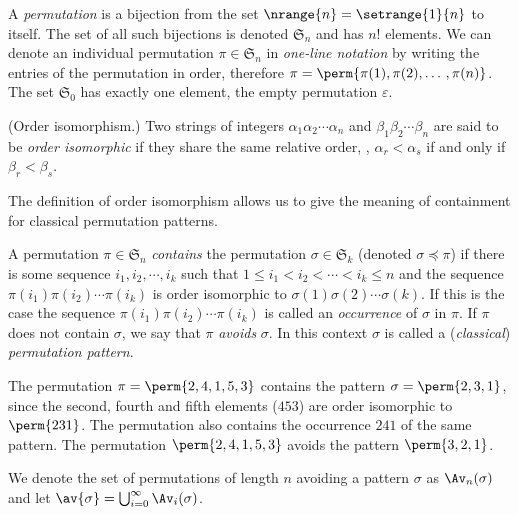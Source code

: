A \emph{permutation} is a bijection from the set \(\nrange{n} = \setrange{1}{n}\) to itself. The
set of all such bijections is denoted \(\mathfrak{S}_n\) and has \(n!\) elements. We can
denote an individual permutation \(\pi\in\mathfrak{S}_n\) in \emph{one-line notation} by writing the
entries of the permutation in order, therefore \(\pi = \perm{\pi(1),\pi(2),\dotso,\pi(n)}\). The
set \(\mathfrak{S}_0\) has exactly one element, the empty permutation \(\varepsilon\).

\begin{definition}{(Order isomorphism.)}
    Two strings of integers \(\alpha_1\alpha_2\dotsm\alpha_n\) and
    \(\beta_1\beta_2\dotsm\beta_n\) are said to be \emph{order isomorphic}
    if they share the same relative order, \ie, \(\alpha_r<\alpha_s\) if and
    only if \(\beta_r<\beta_s\).
\end{definition}

The definition of order isomorphism allows us to give the meaning of containment for classical
permutation patterns.
\begin{definition}
    A permutation \(\pi\in\mathfrak{S}_n\) \emph{contains} the permutation \(\sigma\in\mathfrak{S}_k\) (\mbox{denoted}
    \(\sigma \preceq \pi\)) if there is some sequence \( i_1,i_2,\dotsm{},i_k\)
    such that \(1\le i_1<i_2<\dotsm<i_k\le n\) and the sequence \(\pi(i_1)\pi(i_2)\dotsm\pi(i_k)\) is order isomorphic to
    \(\sigma(1)\sigma(2)\dotsm\sigma(k)\). If this is the case the sequence
    \(\pi(i_1)\pi(i_2)\dotsm\pi(i_k)\) is called an \emph{occurrence} of \(\sigma\)
    in \(\pi\). If \(\pi\) does not contain \(\sigma\), we say that
    \(\pi\) \emph{avoids} \(\sigma\). In this context \(\sigma\) is called a (\emph{classical})
    \emph{permutation pattern}.
\end{definition}

\begin{example}
\label{ex:contexmpl}
The permutation \(\pi = \perm{2,4,1,5,3}\) contains the pattern
\(\sigma = \perm{2,3,1}\), since the second, fourth and fifth elements (\(453\)) are order
isomorphic to \(\perm{231}\). The permutation also contains the occurrence \(241\) of the same pattern. The permutation
\(\perm{2,4,1,5,3}\) avoids the pattern \(\perm{3,2,1}\).
\end{example}

We denote the set of permutations of length \(n\) avoiding a pattern \(\sigma\) as \(\Av_n(\sigma)\)
and let \(\av{\sigma}=\bigcup_{i=0}^{\infty}\Av_i(\sigma)\).

